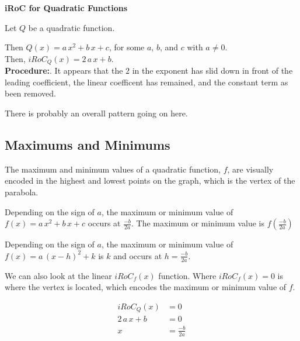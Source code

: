 \documentclass{ximera}
\begin{document}
\begin{procedure} \textbf{\textcolor{blue!75!black}{iRoC for Quadratic Functions}} 



Let $Q$ be a quadratic function.

Then $Q(x) = a \, x^2 + b \, x + c$, for some $a$, $b$, and $c$ with $a \ne 0$. \\

Then, $iRoC_Q(x) = 2 \, a \, x + b$. \\


\textbf{Procedure:}. It appears that the $2$ in the exponent has slid down in front of the leading coefficient, the linear coefficent has remained, and the constant term as been removed. 



\end{procedure}

There is probably an overall pattern going on here. \\












\subsection*{Maximums and Minimums}




The maximum and minimum values of a quadratic function, $f$, are visually encoded in the highest and lowest points on the  graph, which is the vertex of the parabola.

Depending on the sign of $a$, the maximum or minimum value of $f(x) = a \, x^2 + b \, x + c$ occurs at $\frac{-b}{2a}$. The maximum or minimum value is $f\left( \frac{-b}{2a} \right)$


Depending on the sign of $a$, the maximum or minimum value of $f(x) = a \, (x - h)^2 + k$ is $k$ and occurs at $h = \frac{-b}{2a}$. 







We can also look at the linear $iRoC_f(x)$ function.  Where $iRoC_f(x) = 0$ is where the vertex is located, which encodes the maximum or minimum value of $f$.





\begin{align*}
iRoC_Q(x)       &= 0  \\
2 \, a \, x + b  & = 0  \\
x     &=  \frac{-b}{2a}
\end{align*}
\end{document}

